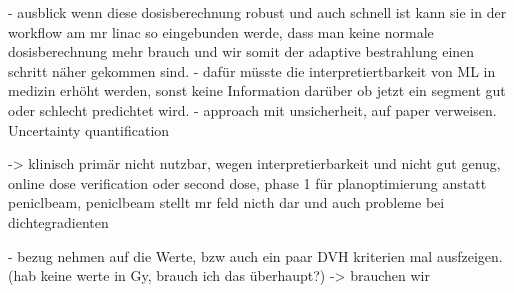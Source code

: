 - ausblick wenn diese dosisberechnung robust und auch schnell ist kann sie in der workflow am mr linac so eingebunden werde, dass man keine normale dosisberechnung mehr brauch und wir somit der adaptive bestrahlung einen schritt näher gekommen sind. 
- dafür müsste die interpretiertbarkeit von ML in medizin erhöht werden, sonst keine Information darüber ob jetzt ein segment gut oder schlecht predichtet wird.
- approach mit unsicherheit, auf paper verweisen. Uncertainty quantification


\vspace*{50pt}

-> klinisch primär nicht nutzbar, wegen interpretierbarkeit und nicht gut genug, online dose verification oder second dose, phase 1 für planoptimierung anstatt peniclbeam, peniclbeam stellt mr feld nicth dar und auch probleme bei dichtegradienten 

- bezug nehmen auf die Werte, bzw auch ein paar DVH kriterien mal ausfzeigen. (hab keine werte in Gy, brauch ich das überhaupt?) -> brauchen wir

